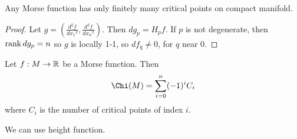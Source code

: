 \documentclass[12pt,class=article,crop=false]{standalone}
\begin{document}
\begin{thm}
Any Morse function has only finitely many critical points on compact manifold.
\end{thm}
\begin{proof}
Let $ g = \left( \frac{d^2 f}{d {x_1 }^2}, \frac{d^2 f}{d {x_n }^2}   \right) $. Then $ d g_p = H_p f$. If $ p$ is not degenerate, then  $ \operatorname{rank} d g_p = n$ so $ g$ is locally 1-1, so  $ df_q \neq 0$, for  $ q$ near 0. 
\end{proof}

\begin{thm}
Let $ f: M \to \mathbb{R}$ be a Morse function. Then
\begin{align*}
	\Chi(M) = \sum_{ i= 0}^{ n} (-1)^{i} C_i
\end{align*}
where $ C_i$ is the number of critical points of index $ i$.
\end{thm}
\begin{eg}
We can use height function.
\end{eg}
\end{document}
